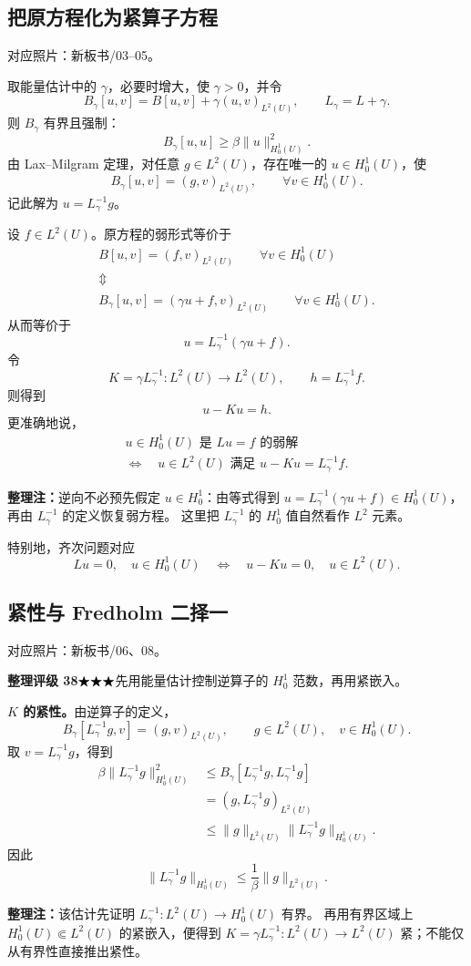 \documentclass[UTF8,a4paper,11pt,fontset=fandol]{ctexart}
\newcommand{\ednote}[1]{\par{\small\color{notegray}\textbf{整理注：}#1}\par}
\newcommand{\source}[1]{{\small\color{notegray}对应照片：#1。}\par}
\newcommand{\proofstars}[1]{\ensuremath{%
\ifnum#1>0\relax\bigstar\fi
\ifnum#1>1\relax\bigstar\fi
\ifnum#1>2\relax\bigstar\fi
\ifnum#1>3\relax\bigstar\fi
\ifnum#1>4\relax\bigstar\fi}}
\newcommand{\proofrating}[3]{\par{\small\color{proofblue}%
\textbf{整理评级 #1}\enspace\proofstars{#2}\quad #3\par}}
\begin{document}
\newpage
\subsection{把原方程化为紧算子方程}
\source{新板书/03--05}
取能量估计中的 $\gamma$，必要时增大，使 $\gamma>0$，并令
\[
B_\gamma[u,v]=B[u,v]+\gamma(u,v)_{L^2(U)},\qquad L_\gamma=L+\gamma.
\]
则 $B_\gamma$ 有界且强制：
\[
B_\gamma[u,u]\geq\beta\|u\|_{H_0^1(U)}^2.
\]
由 Lax--Milgram 定理，对任意 $g\in L^2(U)$，存在唯一的 $u\in H_0^1(U)$，使
\[
B_\gamma[u,v]=(g,v)_{L^2(U)},\qquad\forall v\in H_0^1(U).
\]
记此解为 $u=L_\gamma^{-1}g$。

设 $f\in L^2(U)$。原方程的弱形式等价于
\[
\begin{gathered}
B[u,v]=(f,v)_{L^2(U)}\qquad\forall v\in H_0^1(U)\\
\Updownarrow\\
B_\gamma[u,v]=(\gamma u+f,v)_{L^2(U)}\qquad\forall v\in H_0^1(U).
\end{gathered}
\]
从而等价于
\[
u=L_\gamma^{-1}(\gamma u+f).
\]
令
\[
K=\gamma L_\gamma^{-1}:L^2(U)\longrightarrow L^2(U),\qquad
h=L_\gamma^{-1}f.
\]
则得到
\[
\boxed{u-Ku=h.}
\]
更准确地说，
\[
\begin{gathered}
u\in H_0^1(U)\text{ 是 }Lu=f\text{ 的弱解}\\
\Longleftrightarrow\quad
u\in L^2(U)\text{ 满足 }u-Ku=L_\gamma^{-1}f.
\end{gathered}
\]
\ednote{逆向不必预先假定 $u\in H_0^1$：由等式得到
$u=L_\gamma^{-1}(\gamma u+f)\in H_0^1(U)$，再由 $L_\gamma^{-1}$ 的定义恢复弱方程。
这里把 $L_\gamma^{-1}$ 的 $H_0^1$ 值自然看作 $L^2$ 元素。}

特别地，齐次问题对应
\[
Lu=0,\quad u\in H_0^1(U)
\quad\Longleftrightarrow\quad
u-Ku=0,\quad u\in L^2(U).
\]

\newpage
\subsection{紧性与 Fredholm 二择一}
\source{新板书/06、08}
\proofrating{38}{3}{先用能量估计控制逆算子的 $H_0^1$ 范数，再用紧嵌入。}
\textbf{$K$ 的紧性。}由逆算子的定义，
\[
B_\gamma[L_\gamma^{-1}g,v]=(g,v)_{L^2(U)},\qquad
g\in L^2(U),\quad v\in H_0^1(U).
\]
取 $v=L_\gamma^{-1}g$，得到
\[
\begin{aligned}
\beta\|L_\gamma^{-1}g\|_{H_0^1(U)}^2
&\leq B_\gamma[L_\gamma^{-1}g,L_\gamma^{-1}g]\\
&=(g,L_\gamma^{-1}g)_{L^2(U)}\\
&\leq\|g\|_{L^2(U)}\|L_\gamma^{-1}g\|_{H_0^1(U)}.
\end{aligned}
\]
因此
\[
\boxed{\|L_\gamma^{-1}g\|_{H_0^1(U)}
\leq\frac1\beta\|g\|_{L^2(U)}.}
\]
\ednote{该估计先证明 $L_\gamma^{-1}:L^2(U)\to H_0^1(U)$ 有界。
再用有界区域上 $H_0^1(U)\Subset L^2(U)$ 的紧嵌入，便得到
$K=\gamma L_\gamma^{-1}:L^2(U)\to L^2(U)$ 紧；不能仅从有界性直接推出紧性。}
\end{document}
